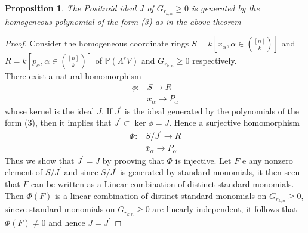 \documentclass[12pt]{report}
\theoremstyle{theorem}
\newtheorem{proposition}[theorem]{Proposition}
\begin{document}
\begin{proposition}
The Positroid ideal $J$ of $G_{r_{k,n}}\geq0$ is generated by the homogeneous polynomial of the form (3) as in the above theorem 
\end{proposition}
\begin{proof}
Consider the homogeneous coordinate rings $S = k[x_{\alpha},\alpha\in\binom{[n]}{k}]$ and $R = k[p_{\alpha},\alpha\in\binom{[n]}{k}]$ of $\mathbb{P}(\Lambda^rV)$ and $G_{r_{k,n}}\geq0$ respectively.\\
There exist a natural homomorphism
\begin{align*}
\phi:& S\longrightarrow R\\
& x_\alpha \longrightarrow P_{\alpha}
\end{align*}
whose kernel is the ideal $J$. If $J^\prime$ is the ideal generated by the polynomials of the form (3), then it implies that $J^\prime\subset\ker\phi = J$. Hence a surjective homomorphism
\begin{align*}
\Phi:& S/J^{\prime} \longrightarrow R\\
&\bar{x}_{\alpha}\longrightarrow P_\alpha
\end{align*}
Thus we show that $J^\prime = J$ by prooving that $\Phi$ is injective. Let $F$ e any nonzero element of $S/J^{\prime}$ and since $S/J^{\prime}$ is generated by standard monomials, it then seen that $F$ can be written as a Linear combination of distinct standard monomials. Then $\Phi(F)$ is a linear combination of distinct  standard monomials on $G_{r_{k,n}}\geq 0$, sincve standard monomials on  $G_{r_{k,n}}\geq 0$ are linearly independent, it follows that $\Phi(F)\neq 0$ and hence $J = J^\prime$
\end{proof}
\end{document}
